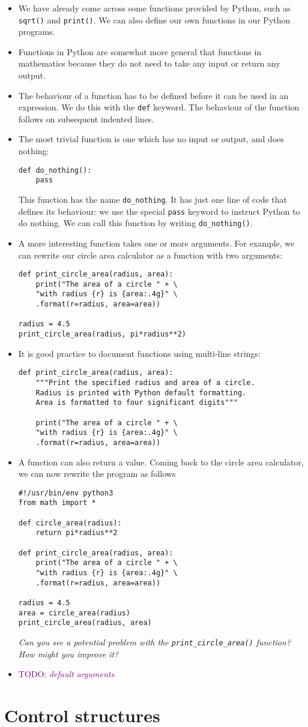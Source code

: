 \documentclass[a4paper,twoside]{memoir}
\newcommand{\shellcmd}{\texttt}
\newcommand{\TODO}[1]{\textcolor{purple}{TODO: \emph{#1}}}
\begin{document}
\begin{itemize}
	\item We have already come across some functions provided by Python, such as \shellcmd{sqrt()} and \shellcmd{print()}.  We can also define our own functions in our Python programs.
	\item Functions in Python are somewhat more general that functions in mathematics because they do not need to take any input or return any output.
	\item The behaviour of a function has to be defined before it can be used in an expression.  We do this with the \shellcmd{def} keyword.  The behaviour of the function follows on subsequent indented lines.
	\item The most trivial function is one which has no input or output, and does nothing:
\begin{verbatim}
def do_nothing():
	pass
\end{verbatim}
This function has the name \shellcmd{do\_nothing}.  It has just one line of code that defines its behaviour: we use the special \shellcmd{pass} keyword to instruct Python to do nothing.  We can call this function by writing \shellcmd{do\_nothing()}.
	\item A more interesting function takes one or more arguments.  For example, we can rewrite our circle area calculator as a function with two arguments:
\begin{verbatim}
def print_circle_area(radius, area):
	print("The area of a circle " + \
	"with radius {r} is {area:.4g}" \
	.format(r=radius, area=area))

radius = 4.5
print_circle_area(radius, pi*radius**2)
\end{verbatim}
\item It is good practice to document functions using multi-line strings:
\begin{verbatim}
def print_circle_area(radius, area):
	"""Print the specified radius and area of a circle.
	Radius is printed with Python default formatting.
	Area is formatted to four significant digits"""

	print("The area of a circle " + \
	"with radius {r} is {area:.4g}" \
	.format(r=radius, area=area))
\end{verbatim}

\item A function can also return a value.  Coming back to the circle area calculator, we can now rewrite the program as follows
\begin{verbatim}
#!/usr/bin/env python3
from math import *

def circle_area(radius):
	return pi*radius**2

def print_circle_area(radius, area):
	print("The area of a circle " + \
	"with radius {r} is {area:.4g}" \
	.format(r=radius, area=area))

radius = 4.5
area = circle_area(radius)
print_circle_area(radius, area)
\end{verbatim}
\textit{Can you see a potential problem with the \texttt{print_circle_area()} function?  How might you improve it?}
\item \TODO{default arguments}
\end{itemize}

\section{Control structures}

\end{document}
